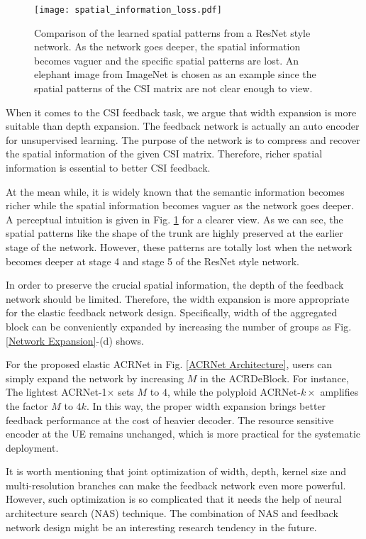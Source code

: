 \documentclass[12pt, draftclsnofoot, onecolumn]{IEEEtran}
\begin{document}
\begin{figure}[!b]
\centering
\texttt{[image: spatial\_information\_loss.pdf]}
\caption{Comparison of the learned spatial patterns from a ResNet style network. As the network goes deeper, the spatial information becomes vaguer and the specific spatial patterns are lost. An elephant image from ImageNet \cite{deng2009imagenet} is chosen as an example since the spatial patterns of the CSI matrix are not clear enough to view.}
\label{Spatial Information Loss}
\end{figure}

When it comes to the CSI feedback task, we argue that width expansion is more suitable than depth expansion. The feedback network is actually an auto encoder for unsupervised learning. The purpose of the network is to compress and recover the spatial information of the given CSI matrix. Therefore, richer spatial information is essential to better CSI feedback.

At the mean while, it is widely known that the semantic information becomes richer while the spatial information becomes vaguer as the network goes deeper. A perceptual intuition is given in Fig. \ref{Spatial Information Loss} for a clearer view. As we can see, the spatial patterns like the shape of the trunk are highly preserved at the earlier stage of the network. However, these patterns are totally lost when the network becomes deeper at stage 4 and stage 5 of the ResNet style network.

In order to preserve the crucial spatial information, the depth of the feedback network should be limited. Therefore, the width expansion is more appropriate for the elastic feedback network design. Specifically, width of the aggregated block can be conveniently expanded by increasing the number of groups as Fig. \ref{Network Expansion}-(d) shows.

For the proposed elastic ACRNet in Fig. \ref{ACRNet Architecture}, users can simply expand the network by increasing $M$ in the ACRDeBlock. For instance, The lightest ACRNet-1$\times$ sets $M$ to $4$, while the polyploid ACRNet-$k\times$ amplifies the factor $M$ to $4k$. In this way, the proper width expansion brings better feedback performance at the cost of heavier decoder. The resource sensitive encoder at the UE remains unchanged, which is more practical for the systematic deployment.

It is worth mentioning that joint optimization of width, depth, kernel size and multi-resolution branches can make the feedback network even more powerful. However, such optimization is so complicated that it needs the help of neural architecture search (NAS) \cite{barret2017neural} technique. The combination of NAS and feedback network design might be an interesting research tendency in the future.
\end{document}
